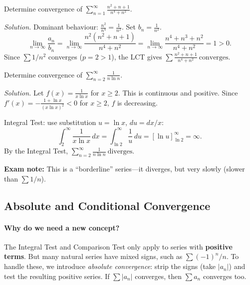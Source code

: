 \begin{examplebox}[title={Worked Example (Tutorial 9, Q2(d)): $\sum \frac{n^2+n+1}{n^4+n^2}$ converges}]
Determine convergence of $\displaystyle\sum_{n=1}^{\infty}\frac{n^2+n+1}{n^4+n^2}$.

\emph{Solution.}
Dominant behaviour: $\frac{n^2}{n^4}=\frac{1}{n^2}$. Set $b_n=\frac{1}{n^2}$.
\[
\lim_{n\to\infty}\frac{a_n}{b_n}=\lim_{n\to\infty}\frac{n^2(n^2+n+1)}{n^4+n^2}=\lim_{n\to\infty}\frac{n^4+n^3+n^2}{n^4+n^2}=1>0.
\]
Since $\sum 1/n^2$ converges ($p=2>1$), the LCT gives $\displaystyle\boxed{\sum\frac{n^2+n+1}{n^4+n^2}\ \text{converges}}$.
\end{examplebox}

\begin{examplebox}[title={Worked Example (Tutorial 9, Q2(f)): $\sum \frac{1}{n\ln n}$ diverges}]
Determine convergence of $\displaystyle\sum_{n=2}^{\infty}\frac{1}{n\ln n}$.

\emph{Solution.}
Let $f(x)=\frac{1}{x\ln x}$ for $x\ge 2$. This is continuous and positive. Since $f'(x)=-\frac{1+\ln x}{(x\ln x)^2}<0$ for $x\ge 2$, $f$ is decreasing.

Integral Test: use substitution $u=\ln x$, $du=dx/x$:
\[
\int_2^{\infty}\frac{1}{x\ln x}\,dx=\int_{\ln 2}^{\infty}\frac{1}{u}\,du=\left[\ln u\right]_{\ln 2}^{\infty}=\infty.
\]
By the Integral Test, $\displaystyle\boxed{\sum_{n=2}^{\infty}\frac{1}{n\ln n}\ \text{diverges}}$.

\textbf{Exam note:} This is a ``borderline'' series---it diverges, but very slowly (slower than $\sum 1/n$).
\end{examplebox}

\subsection{Absolute and Conditional Convergence}

\paragraph{Why do we need a new concept?}
The Integral Test and Comparison Test only apply to series with \textbf{positive terms}.
But many natural series have mixed signs, such as $\sum (-1)^n/n$.
To handle these, we introduce \emph{absolute convergence}: strip the signs (take $|a_n|$) and test the resulting positive series.
If $\sum |a_n|$ converges, then $\sum a_n$ converges too.

